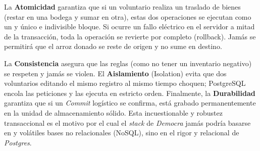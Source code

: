 La \textbf{Atomicidad} garantiza que si un voluntario realiza un traslado de bienes (restar en una bodega y sumar en otra), estas dos operaciones se ejecutan como un y único e indivisible bloque. Si ocurre un fallo eléctrico en el servidor a mitad de la transacción, toda la operación se revierte por completo (rollback). Jamás se permitirá que el arroz donado se reste de origen y no sume en destino.

La \textbf{Consistencia} asegura que las reglas (como no tener un inventario negativo) se respeten y jamás se violen. El \textbf{Aislamiento} (Isolation) evita que dos voluntarios editando el mismo registro al mismo tiempo choquen; PostgreSQL encola las peticiones y las ejecuta en estricto orden. Finalmente, la \textbf{Durabilidad} garantiza que si un \textit{Commit} logístico se confirma, está grabado permanentemente en la unidad de almacenamiento sólido. Esta incuestionable y robustez transaccional es el motivo por el cual el \textit{stack} de \textit{Democra} jamás podría basarse en y volátiles bases no relacionales (NoSQL), sino en el rigor y relacional de \textit{Postgres}.
